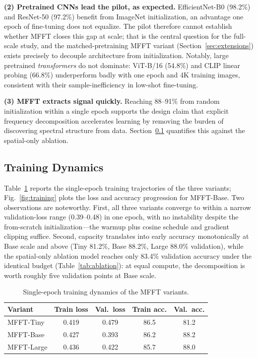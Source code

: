 \documentclass[journal]{IEEEtran}
\begin{document}
\textbf{(2) Pretrained CNNs lead the pilot, as expected.} EfficientNet-B0 (98.2\%) and ResNet-50 (97.2\%) benefit from ImageNet initialization, an advantage one epoch of fine-tuning does not equalize. The pilot therefore cannot establish whether MFFT closes this gap at scale; that is the central question for the full-scale study, and the matched-pretraining MFFT variant (Section~\ref{sec:extensions}) exists precisely to decouple architecture from initialization. Notably, large pretrained \emph{transformers} do not dominate: ViT-B/16 (54.8\%) and CLIP linear probing (66.8\%) underperform badly with one epoch and 4K training images, consistent with their sample-inefficiency in low-shot fine-tuning.

\textbf{(3) MFFT extracts signal quickly.} Reaching 88--91\% from random initialization within a single epoch supports the design claim that explicit frequency decomposition accelerates learning by removing the burden of discovering spectral structure from data. Section~\ref{sec:dynamics} quantifies this against the spatial-only ablation.

\subsection{Training Dynamics}
\label{sec:dynamics}
Table~\ref{tab:dynamics} reports the single-epoch training trajectories of the three variants; Fig.~\ref{fig:training} plots the loss and accuracy progression for MFFT-Base. Two observations are noteworthy. First, all three variants converge to within a narrow validation-loss range (0.39--0.48) in one epoch, with no instability despite the from-scratch initialization---the warmup plus cosine schedule and gradient clipping suffice. Second, capacity translates into early accuracy monotonically at Base scale and above (Tiny 81.2\%, Base 88.2\%, Large 88.0\% validation), while the spatial-only ablation model reaches only 83.4\% validation accuracy under the identical budget (Table~\ref{tab:ablation}): at equal compute, the decomposition is worth roughly five validation points at Base scale.

\begin{table}[!t]
\renewcommand{\arraystretch}{1.2}
\caption{Single-epoch training dynamics of the MFFT variants.}
\label{tab:dynamics}
\centering
\setlength{\tabcolsep}{4pt}
\begin{tabular}{lcccc}
\toprule
Variant & Train loss & Val.\ loss & Train acc. & Val.\ acc. \\
\midrule
MFFT-Tiny  & 0.419  & 0.479 & 86.5 & 81.2 \\
MFFT-Base  & 0.427  & 0.393 & 86.2 & 88.2 \\
MFFT-Large & 0.436  & 0.422 & 85.7 & 88.0 \\
\bottomrule
\end{tabular}
\end{table}
\end{document}
